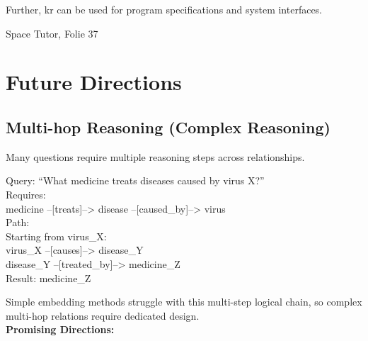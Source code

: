 Further, \gls{kr} can be used for program specifications and system interfaces.


\begin{bsp}
    Space Tutor, Folie 37
\end{bsp}


\section{Future Directions}\label{sec:future-directions}

\subsection*{Multi-hop Reasoning (Complex Reasoning)}
Many questions require multiple reasoning steps across relationships.
\begin{bsp}
    Query: ``What medicine treats diseases caused by virus X?'' \\
    Requires: \\
    medicine --[treats]--> disease --[caused\_by]--> virus \\
    Path: \\
    Starting from virus\_X: \\
    virus\_X --[causes]--> disease\_Y \\
    disease\_Y --[treated\_by]--> medicine\_Z \\
    Result: medicine\_Z
\end{bsp}
Simple embedding methods struggle with this multi-step logical chain, so complex multi-hop relations require dedicated
design. \\
\textbf{Promising Directions:}
